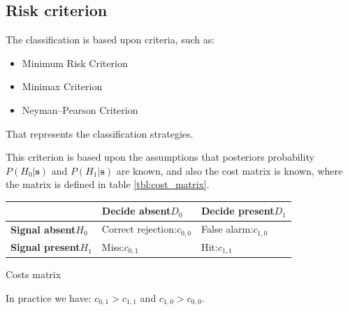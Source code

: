 \subsection{Risk criterion}
The classification is based upon criteria, such as:
\begin{itemize}
\item Minimum Risk Criterion
\item Minimax Criterion
\item Neyman--Pearson Criterion
\end{itemize}
That represents the classification strategies.

This criterion is based upon the assumptions that posteriors probability ${P(H_0|\mathbf{s})}$ and ${P(H_1|\mathbf{s})}$ are known, and also the cost matrix is known, where the matrix is defined in table \ref{tbl:cost_matrix}.
\begin{margintable}
	\renewcommand{\arraystretch}{1}
	\begin{centering} 
		\begin{tabular}{>{\centering} m{1.25cm} <{\centering} | >{\centering} m{1.25cm} <{\centering} >{\centering} m{1.25cm} <{\centering}}
		\hline										& \scriptsize{\textbf{Decide absent}\newline$D_0$} & \scriptsize{\textbf{Decide present}\newline$D_1$} \tabularnewline \hline
		\scriptsize{\textbf{Signal absent}\newline$H_0$}  	& \cellcolor{lgray}\scriptsize{Correct rejection:\newline$c_{0,0}$} & \cellcolor{dgray}\scriptsize{False alarm:\newline$c_{1,0}$}        \tabularnewline
		\scriptsize{\textbf{Signal present}\newline$H_1$} 	& \cellcolor{dgray}\scriptsize{Miss:\newline$c_{0,1}$}              & \cellcolor{lgray}\scriptsize{Hit:\newline$c_{1,1}$}                \tabularnewline \hline
		\end{tabular}
	\end{centering} 
	\renewcommand{\arraystretch}{1.75}
	\caption{Costs matrix}
	\label{tbl:cost_matrix}
\end{margintable}
In practice we have: ${c_{0,1} > c_{1,1}}$ and ${c_{1,0} > c_{0,0}}$.

